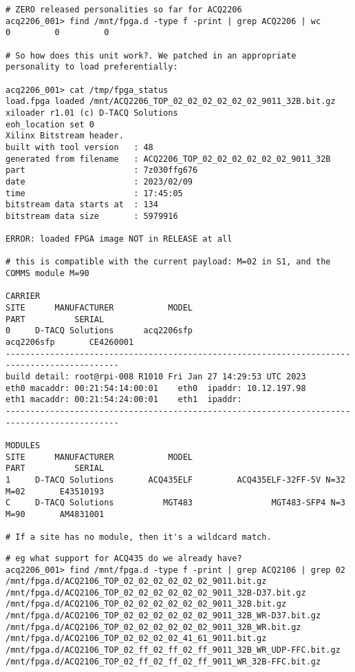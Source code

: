 \documentclass[]{article}
\begin{document}
\begin{lstlisting}[style=bashstyle,frame=single]
# ZERO released personalities so far for ACQ2206
acq2206_001> find /mnt/fpga.d -type f -print | grep ACQ2206 | wc
0         0         0

# So how does this unit work?. We patched in an appropriate personality to load preferentially:

acq2206_001> cat /tmp/fpga_status
load.fpga loaded /mnt/ACQ2206_TOP_02_02_02_02_02_02_9011_32B.bit.gz
xiloader r1.01 (c) D-TACQ Solutions
eoh_location set 0
Xilinx Bitstream header.
built with tool version   : 48
generated from filename   : ACQ2206_TOP_02_02_02_02_02_02_9011_32B
part                      : 7z030ffg676
date                      : 2023/02/09
time                      : 17:45:05
bitstream data starts at  : 134
bitstream data size       : 5979916

ERROR: loaded FPGA image NOT in RELEASE at all

# this is compatible with the current payload: M=02 in S1, and the COMMS module M=90

CARRIER
SITE      MANUFACTURER           MODEL                                PART          SERIAL
0     D-TACQ Solutions      acq2206sfp                          acq2206sfp       CE4260001
---------------------------------------------------------------------------------------------
build detail: root@rpi-008 R1010 Fri Jan 27 14:29:53 UTC 2023
eth0 macaddr: 00:21:54:14:00:01    eth0  ipaddr: 10.12.197.98
eth1 macaddr: 00:21:54:24:00:01    eth1  ipaddr:
---------------------------------------------------------------------------------------------

MODULES
SITE      MANUFACTURER           MODEL                                PART          SERIAL
1     D-TACQ Solutions       ACQ435ELF         ACQ435ELF-32FF-5V N=32 M=02       E43510193
C     D-TACQ Solutions          MGT483                MGT483-SFP4 N=3 M=90       AM4831001

# If a site has no module, then it's a wildcard match.
\end{lstlisting}
\pagebreak
\begin{lstlisting}[style=bashstyle,frame=single]
# eg what support for ACQ435 do we already have?
acq2206_001> find /mnt/fpga.d -type f -print | grep ACQ2106 | grep 02
/mnt/fpga.d/ACQ2106_TOP_02_02_02_02_02_02_9011.bit.gz
/mnt/fpga.d/ACQ2106_TOP_02_02_02_02_02_02_9011_32B-D37.bit.gz
/mnt/fpga.d/ACQ2106_TOP_02_02_02_02_02_02_9011_32B.bit.gz
/mnt/fpga.d/ACQ2106_TOP_02_02_02_02_02_02_9011_32B_WR-D37.bit.gz
/mnt/fpga.d/ACQ2106_TOP_02_02_02_02_02_02_9011_32B_WR.bit.gz
/mnt/fpga.d/ACQ2106_TOP_02_02_02_02_41_61_9011.bit.gz
/mnt/fpga.d/ACQ2106_TOP_02_ff_02_ff_02_ff_9011_32B_WR_UDP-FFC.bit.gz
/mnt/fpga.d/ACQ2106_TOP_02_ff_02_ff_02_ff_9011_WR_32B-FFC.bit.gz
\end{lstlisting}
\end{document}
